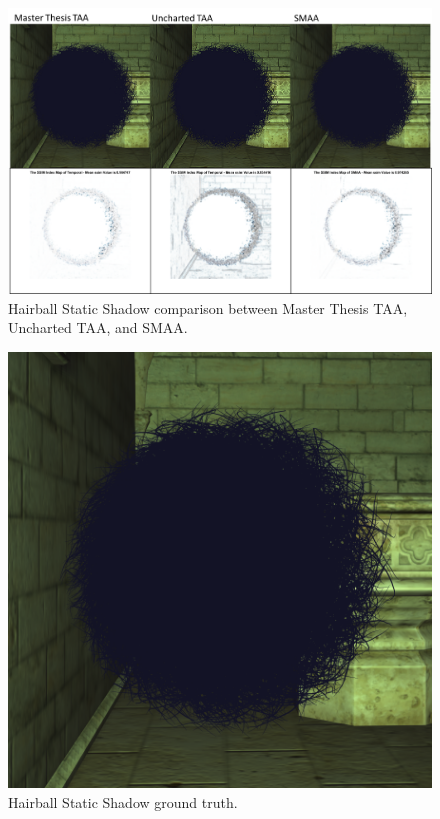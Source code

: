 \documentclass{cslthse-msc}
\begin{document}
\begin{figure}[H]
	\centering
	\includegraphics[scale=0.9]{images/results/hairball_static_shadow.png}
	\caption{Hairball Static Shadow comparison between Master Thesis TAA, Uncharted TAA, and SMAA.}\label{fig:hairball_static_shadow_render}
\end{figure}

\begin{figure}[H]
	\centering
	\includegraphics[scale=0.3]{images/results/hairball_sobel_ground_truth.png}
	\caption{Hairball Static Shadow ground truth.}\label{fig:hairball_static_shadow_truth}
\end{figure}
\end{document}
